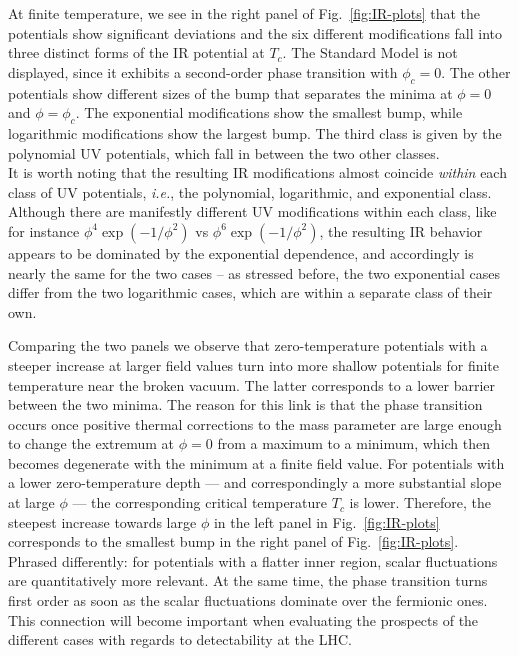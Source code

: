 \documentclass[aps,prd,11pt,tightenlines,superscriptaddress,nofootinbib,preprintnumbers,notitlepage]{revtex4-1}
\newcommand{\ie}{\textsl{i.e.}\;}
\begin{document}
At finite temperature, we see in the right panel of
Fig.~\ref{fig:IR-plots} that the potentials show significant
deviations and the six different modifications fall into three
distinct forms of the IR potential at $T_c$.  The Standard Model is
not displayed, since it exhibits a second-order phase transition with
$\phi_c=0$. The other potentials show different sizes of the bump
that separates the minima at $\phi=0$ and $\phi=\phi_c$. The
exponential modifications show the smallest bump, while logarithmic
modifications show the largest bump.  The third class is given by the
polynomial UV potentials, which fall in between the two other classes. \\ 

It is worth noting that the resulting IR modifications almost coincide
\emph{within} each class of UV potentials, \ie, the polynomial,
logarithmic, and exponential class. Although there are manifestly
different UV modifications within each class, like for instance
$\phi^4\exp(-1/\phi^2)$ vs $\phi^6\exp(-1/\phi^2)$, the resulting
IR behavior appears to be dominated by the exponential dependence, and
accordingly is nearly the same for the two cases -- as stressed
before, the two exponential cases differ from the two logarithmic
cases, which are within a separate class of their own.

Comparing the two panels we observe that zero-temperature potentials
with a steeper increase at larger field values turn into more shallow
potentials for finite temperature near the broken vacuum.  The latter
corresponds to a lower barrier between the two minima. The reason for
this link is that the phase transition occurs once positive thermal
corrections to the mass parameter are large enough to change the
extremum at $\phi=0$ from a maximum to a minimum, which then becomes
degenerate with the minimum at a finite field value.  For potentials
with a lower zero-temperature depth --- and correspondingly a more
substantial slope at large $\phi$ --- the corresponding critical
temperature $T_c$ is lower.  Therefore, the steepest increase towards
large $\phi$ in the left panel in Fig.~\ref{fig:IR-plots} corresponds
to the smallest bump in the right panel of
Fig.~\ref{fig:IR-plots}. Phrased differently: for potentials with a
flatter inner region, scalar fluctuations are quantitatively more
relevant. At the same time, the phase transition turns first order as
soon as the scalar fluctuations dominate over the fermionic ones.
This connection will become important when evaluating the prospects of
the different cases with regards to detectability at the LHC.
\end{document}
